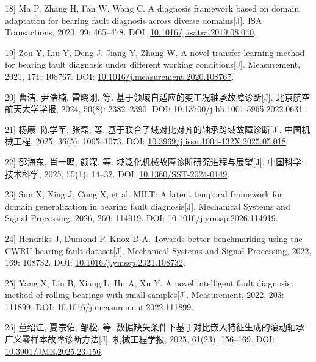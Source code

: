 \documentclass[UTF8,12pt,openany,twoside]{ctexbook}
\numberwithin{equation}{chapter}
\begin{document}
\noindent\begingroup\samepage {[}18{]} Ma P, Zhang H, Fan W, Wang C. A diagnosis framework based on domain adaptation for bearing fault diagnosis across diverse domains[J]. ISA Transactions, 2020, 99: 465--478. DOI: \url{10.1016/j.isatra.2019.08.040}.\par\endgroup

\noindent\begingroup\samepage {[}19{]} Zou Y, Liu Y, Deng J, Jiang Y, Zhang W. A novel transfer learning method for bearing fault diagnosis under different working conditions[J]. Measurement, 2021, 171: 108767. DOI: \url{10.1016/j.measurement.2020.108767}.\par\endgroup

\noindent\begingroup\samepage {[}20{]} 曹洁, 尹浩楠, 雷晓刚, 等. 基于领域自适应的变工况轴承故障诊断[J]. 北京航空航天大学学报, 2024, 50(8): 2382--2390. DOI: \url{10.13700/j.bh.1001-5965.2022.0631}.\par\endgroup

\noindent\begingroup\samepage {[}21{]} 杨康, 陈学军, 张磊, 等. 基于联合子域对比对齐的轴承跨域故障诊断[J]. 中国机械工程, 2025, 36(5): 1065--1073. DOI: \url{10.3969/j.issn.1004-132X.2025.05.018}.\par\endgroup

\noindent\begingroup\samepage {[}22{]} 邵海东, 肖一鸣, 颜深, 等. 域泛化机械故障诊断研究进程与展望[J]. 中国科学: 技术科学, 2025, 55(1): 14--32. DOI: \url{10.1360/SST-2024-0149}.\par\endgroup

\noindent\begingroup\samepage {[}23{]} Sun X, Xing J, Cong X, et al. MILT: A latent temporal framework for domain generalization in bearing fault diagnosis[J]. Mechanical Systems and Signal Processing, 2026, 260: 114919. DOI: \url{10.1016/j.ymssp.2026.114919}.\par\endgroup

\noindent\begingroup\samepage {[}24{]} Hendriks J, Dumond P, Knox D A. Towards better benchmarking using the CWRU bearing fault dataset[J]. Mechanical Systems and Signal Processing, 2022, 169: 108732. DOI: \url{10.1016/j.ymssp.2021.108732}.\par\endgroup

\noindent\begingroup\samepage {[}25{]} Yang X, Liu B, Xiang L, Hu A, Xu Y. A novel intelligent fault diagnosis method of rolling bearings with small samples[J]. Measurement, 2022, 203: 111899. DOI: \url{10.1016/j.measurement.2022.111899}.\par\endgroup

\noindent\begingroup\samepage {[}26{]} 董绍江, 夏宗佑, 邹松, 等. 数据缺失条件下基于对比嵌入特征生成的滚动轴承广义零样本故障诊断方法[J]. 机械工程学报, 2025, 61(23): 156--169. DOI: \url{10.3901/JME.2025.23.156}.\par\endgroup
\end{document}
